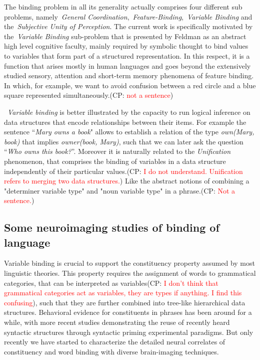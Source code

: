 \documentclass[10pt]{article}
\newcommand{\noteCP}[1]{(CP: \textcolor{red}{#1})}
\begin{document}
The binding problem in all its generality actually comprises four different sub problems, namely~\emph{General Coordination},~\emph{Feature-Binding},~\emph{Variable Binding} and the~\emph{Subjective Unity of Perception}\cite{Feldman_2012}.
The current work is specifically motivated by the~\emph{Variable Binding} sub-problem that is presented by Feldman as an abstract high level cognitive faculty, mainly required by symbolic thought to bind values to variables that form part of a structured representation.
In this respect, it is a function that arises mostly in human languages and goes beyond the extensively studied sensory, attention and short-term memory phenomena of feature binding.
In which, for example, we want to avoid confusion between a red circle and a blue square represented simultaneously.\noteCP{not a sentence}

~\emph{Variable binding} is better illustrated by the capacity to run logical inference on data structures that encode relationships between their items.
For example the sentence ``\emph{Mary owns a book}" allows to establish a relation of the type \emph{own(Mary, book)} that implies \emph{owner(book, Mary)}, such that we can later ask the question ``\emph{Who owns this book?}''.
Moreover it is naturally related to the \emph{Unification} phenomenon, that comprises the binding of variables in a data structure independently of their particular values.\noteCP{I do not understand. Unification refers to merging two data structures.}
Like the abstract notions of combining a "determiner variable type" and "noun variable type" in a phrase.\noteCP{Not a sentence.}

\subsection{Some neuroimaging studies of binding of language}

{\label{729344}}

Variable binding is crucial to support the constituency property assumed by most linguistic theories.
This property requires the assignment of words to grammatical categories, that can be interpreted as variables\noteCP{I don't think that grammatical categories act as variables, they are types if anything. I find this confusing}, such that they are further combined into tree-like hierarchical data structures.
Behavioral evidence for constituents in phrases has been around for a while\cite{bever1969underlying, abrams1969syntactic}, with more recent studies demonstrating the reuse of recently heard syntactic structures through syntactic priming experimental paradigms\cite{bock2007persistent, branigan2000syntactic}.
But only recently we have started to characterize the detailed neural correlates of constituency and word binding with diverse brain-imaging techniques\cite{Nelson_2017, fedorenko2016neural, brennan2016abstract, ding2016cortical, bemis2012basic, Pallier_2011, bastiaansen2010syntactic, longe2006grammatical}.
\end{document}
